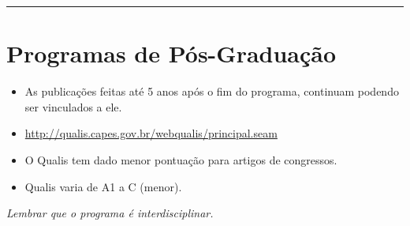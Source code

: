\rule{\textwidth}{1pt}

\section{Programas de Pós-Graduação} 

    \begin{itemize}
        \item As publicações feitas até 5 anos após o fim do programa, continuam podendo ser vinculados a ele.
        \item \url{http://qualis.capes.gov.br/webqualis/principal.seam}
        \item O Qualis tem dado menor pontuação para artigos de congressos.
        \item Qualis varia de A1 a C (menor).
    \end{itemize}

    \textit{Lembrar que o programa é interdisciplinar.}